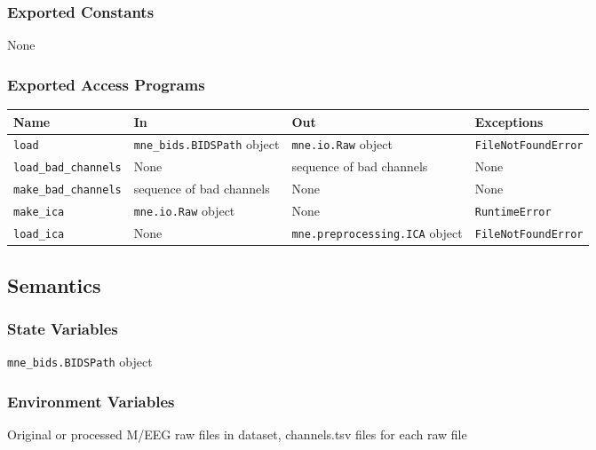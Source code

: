 \documentclass[12pt, titlepage]{article}
\begin{document}
\subsubsection{Exported Constants}


None




\subsubsection{Exported Access Programs}


\begin{center}
\begin{tabular}{p{4cm} p{4cm} p{4cm} p{2cm}}
\hline
    \textbf{Name} & \textbf{In} & \textbf{Out} & \textbf{Exceptions} \\
\hline
    \lstinline|load| & \lstinline|mne_bids.BIDSPath| object & \lstinline|mne.io.Raw| object & \lstinline|FileNotFoundError| \\
    \lstinline|load_bad_channels| & None & sequence of bad channels & None \\
    \lstinline|make_bad_channels| & sequence of bad channels & None & None \\
    \lstinline|make_ica| & \lstinline|mne.io.Raw| object & None & \lstinline|RuntimeError| \\
    \lstinline|load_ica| & None & \lstinline|mne.preprocessing.ICA| object & \lstinline|FileNotFoundError| \\
\hline
\end{tabular}
\end{center}




\subsection{Semantics}


\subsubsection{State Variables}


\lstinline|mne_bids.BIDSPath| object




\subsubsection{Environment Variables}


Original or processed M/EEG raw files in dataset, channels.tsv files for each raw file
\end{document}
